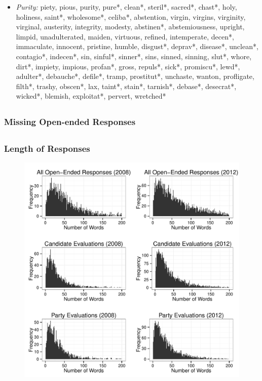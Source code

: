 \documentclass{beamer}
\begin{document}
\begin{frame}
\begin{tiny}
\begin{itemize}
      \item \emph{Purity:} piety, pious, purity, pure*, clean*, steril*, sacred*, chast*, holy, holiness, saint*, wholesome*, celiba*, abstention, virgin, virgins, virginity, virginal, austerity, integrity, modesty, abstinen*, abstemiousness, upright, limpid, unadulterated, maiden, virtuous, refined, intemperate, decen*, immaculate, innocent, pristine, humble, disgust*, deprav*, disease*, unclean*, contagio*, indecen*, sin, sinful*, sinner*, sins, sinned, sinning, slut*, whore, dirt*, impiety, impious, profan*, gross, repuls*, sick*, promiscu*, lewd*, adulter*, debauche*, defile*, tramp, prostitut*, unchaste, wanton, profligate, filth*, trashy, obscen*, lax, taint*, stain*, tarnish*, debase*, desecrat*, wicked*, blemish, exploitat*, pervert, wretched*
    \end{itemize}
  \end{tiny}
\end{frame}

\subsection{}
\begin{frame}%
\frametitle{Missing Open-ended Responses}

\end{frame}

\subsection{}
\begin{frame}%
\frametitle{Length of Responses}
  \begin{figure}[ht]\centering
    \includegraphics[height=.85\textheight]{../calc/fig/a0_num}
  \end{figure}
\end{frame}
\end{document}

